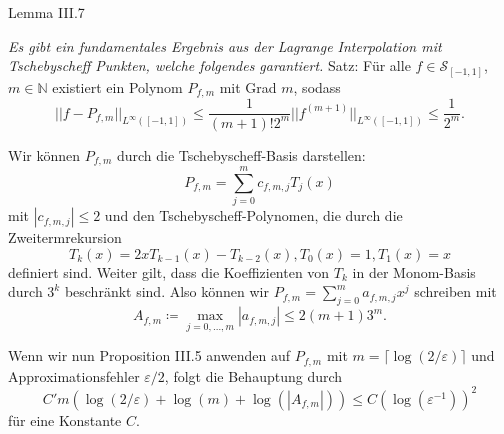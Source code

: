 \documentclass[12pt]{article}
\newcommand{\N}{\mathbb{N}} %
\begin{document}
\newpage

{\Large Lemma III.7}

\textit{Es gibt ein fundamentales Ergebnis aus der Lagrange Interpolation mit 
Tschebyscheff Punkten, welche folgendes garantiert.}
Satz: 
Für alle \(f\in \mathcal{S}_{[-1,1]}\), \(m\in\N\) existiert ein Polynom 
\(P_{f,m}\) mit Grad \(m\), sodass 
\[ ||f - P_{f,m}||_{L^\infty ([-1,1])} \leq \frac{1}{(m+1)!2^m} ||f^{(m+1)}||_{L^\infty ([-1,1])} \leq \frac{1}{2^m}. \]

Wir können \(P_{f,m}\) durch die Tschebyscheff-Basis darstellen: 
\[ P_{f,m} = \sum_{j=0}^m c_{f,m,j} T_j(x) \]
mit \(|c_{f,m,j}| \leq 2\) 
und den Tschebyscheff-Polynomen, die durch die Zweitermrekursion 
\[ T_k(x) = 2x T_{k-1}(x) - T_{k-2}(x), T_0(x) = 1, T_1(x) = x \]
definiert sind.
Weiter gilt, dass die Koeffizienten von \(T_k\) in der Monom-Basis 
durch \(3^k\) beschränkt sind. 
Also können wir \(P_{f,m} = \sum_{j=0}^m a_{f,m,j} x^j\) schreiben mit 
\[ A_{f,m} \coloneqq \max_{j=0,\ldots, m} |a_{f,m,j}| \leq 2(m+1)3^m. \] 

Wenn wir nun Proposition III.5 anwenden auf \(P_{f,m}\) mit \(m= \lceil \log(2/\varepsilon)\rceil\) 
und Approximationsfehler \(\varepsilon/2\), folgt die Behauptung durch
\[ C' m(\log(2/\varepsilon) + \log(m) + \log(|A_{f,m}|)) \leq C (\log(\varepsilon^{-1}))^2 \]
für eine Konstante \(C\).
\end{document}
